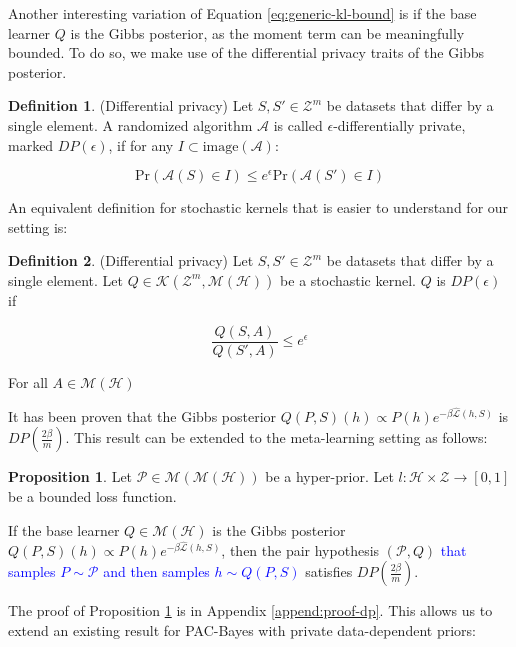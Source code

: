 \documentclass{article}
\theoremstyle{definition}
\newtheorem{defn}{Definition}[section]
\newtheorem{proposition}[theorem]{Proposition}
\newcommand{\LFe}[1]{\textcolor{blue}{#1}}
\begin{document}
Another interesting variation of Equation \ref{eq:generic-kl-bound} is if the base learner $Q$ is the Gibbs posterior, as the moment term can be meaningfully bounded. To do so, we make use of the differential privacy traits of the Gibbs posterior.

\begin{defn} (Differential privacy)
	Let $S,S'\in \mathcal{Z}^m$ be datasets that differ by a single element.
	A randomized algorithm $\mathcal{A}$ is called  $\epsilon$-differentially private, marked $DP(\epsilon)$, if for any $I\subset \mathrm{image}(\mathcal{A})$:
	
	$$\mathrm{Pr}(\mathcal{A}(S)\in I)\leq e^\epsilon \mathrm{Pr}(\mathcal{A}(S')\in I)$$
\end{defn}

An equivalent definition for stochastic kernels that is easier to understand for our setting is:

\begin{defn} (Differential privacy)
	Let $S,S'\in \mathcal{Z}^m$ be datasets that differ by a single element.
	Let $Q\in \mathcal{K}(\mathcal{Z}^m, \mathcal{M}(\mathcal{H}))$ be a stochastic kernel.
	$Q$ is $DP(\epsilon)$ if 
	
	$$\frac{Q(S, A)}{Q(S', A)} \leq e^\epsilon$$
	
	For all $A\in  \mathcal{M}(\mathcal{H})$
\end{defn}

It has been proven \citep{McSherry2007, Rivasplata2020} that the Gibbs posterior $Q(P, S)(h)\propto P(h)e^{-\beta\hat{\mathcal{L}}(h, S)}$ is $DP\left (\frac{2\beta}{m}\right )$.
This result can be extended to the meta-learning setting as follows:

\begin{proposition} \label{thm:pair-is-dp}
	Let $\mathcal{P}\in \mathcal{M}(\mathcal{M}(\mathcal{H}))$ be a hyper-prior.
	Let $l:\mathcal{H}\times \mathcal{Z}\rightarrow [0,1]$ be a bounded loss function.
	
	If the base learner $Q\in \mathcal{M}(\mathcal{H})$ is the Gibbs posterior $Q(P, S)(h)\propto P(h)e^{-\beta\hat{\mathcal{L}}(h, S)}$, 
	then the pair hypothesis $(\mathcal{P}, Q)$ \LFe{that samples $P\sim\mathcal{P}$ and then samples $h\sim Q(P, S)$} satisfies $DP\left (\frac{2\beta}{m}\right )$.
\end{proposition}

The proof of Proposition \ref{thm:pair-is-dp} is in Appendix \ref{append:proof-dp}. This  allows us to extend an existing result for PAC-Bayes with private data-dependent priors:
\end{document}
